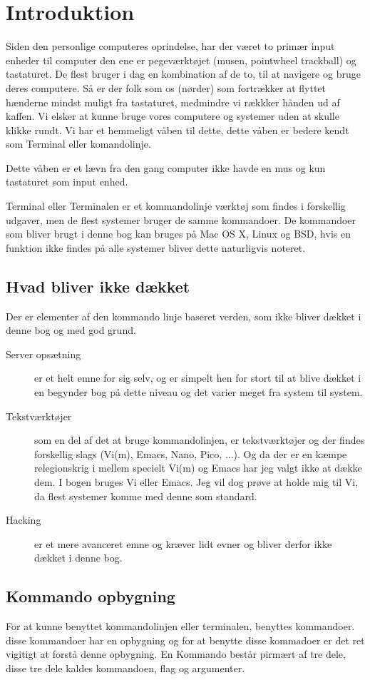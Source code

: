 \chapter{Introduktion}
Siden den personlige computeres oprindelse, har der været to primær input enheder til computer den ene er pegeværktøjet (musen, pointwheel trackball) og tastaturet. De flest bruger i dag en kombination af de to, til at navigere og bruge deres computere. Så er der folk som os (nørder) som fortrækker at flyttet hænderne mindst muligt fra tastaturet, medmindre vi rækkker hånden ud af kaffen. Vi elsker at kunne bruge vores computere og systemer uden at skulle klikke rundt. Vi har et hemmeligt våben til dette, dette våben er bedere kendt som Terminal eller komandolinje.
\par Dette våben er et lævn fra den gang computer ikke havde en mus og kun tastaturet som input enhed.

Terminal eller Terminalen er et kommandolinje værktøj som findes i forskellig udgaver, men de flest systemer bruger de samme kommandoer. De kommandoer som bliver brugt i denne bog kan bruges på Mac OS X, Linux og BSD, hvis en funktion ikke findes på alle systemer bliver dette naturligvis noteret.

\section{Hvad bliver ikke dækket}
Der er elementer af den kommando linje baseret verden, som ikke bliver dækket i denne bog og med god grund.
\begin{description}
  \item[Server opsætning] er et helt emne for sig selv, og er simpelt hen for stort til at blive dækket i en begynder bog på dette niveau og det varier meget fra system til system.
  \item[Tekstværktøjer] som en del af det at bruge kommandolinjen, 
    er tekstværktøjer og der findes forskellig slags (Vi(m), Emacs, Nano, 
    Pico, ...). Og da der er en kæmpe relegionskrig i mellem specielt Vi(m) 
    og Emacs har jeg valgt ikke at dække dem. I bogen bruges Vi eller Emacs. Jeg vil 
    dog prøve at holde mig til Vi, da flest systemer komme med denne som standard.
  \item[Hacking] er et mere avanceret emne og kræver lidt evner og bliver derfor ikke dækket i denne bog.
\end{description}

\section{Kommando opbygning}
For at kunne benyttet kommandolinjen eller terminalen, benyttes kommandoer. disse kommandoer har en opbygning og for at benytte disse kommadoer er det ret vigitigt at forstå denne opbygning. En Kommando består pirmært af tre dele, disse tre dele kaldes kommandoen, flag og argumenter.  
